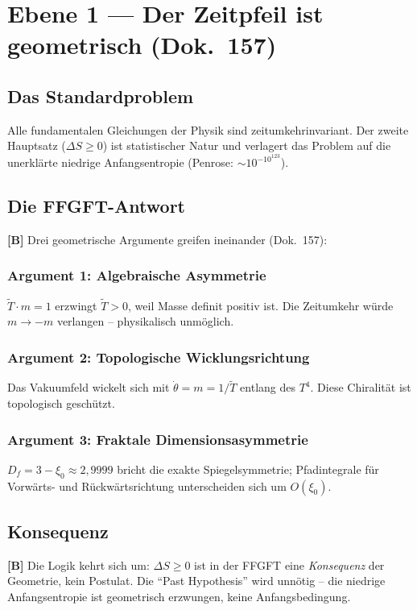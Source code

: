 \section{Ebene 1 --- Der Zeitpfeil ist geometrisch (Dok.~157)}

\subsection{Das Standardproblem}

Alle fundamentalen Gleichungen der Physik sind zeitumkehrinvariant.
Der zweite Hauptsatz ($\Delta S \ge 0$) ist statistischer Natur
und verlagert das Problem auf die unerklärte niedrige Anfangsentropie
(Penrose: $\sim 10^{-10^{123}}$).

\subsection{Die FFGFT-Antwort}

\textbf{[B]} Drei geometrische Argumente greifen ineinander (Dok.~157):

\subsubsection{Argument 1: Algebraische Asymmetrie}
$\tilde{T} \cdot m = 1$ erzwingt $\tilde{T} > 0$, weil Masse definit
positiv ist. Die Zeitumkehr würde $m \to -m$ verlangen –
physikalisch unmöglich.

\subsubsection{Argument 2: Topologische Wicklungsrichtung}
Das Vakuumfeld wickelt sich mit $\dot\theta = m = 1/\tilde{T}$
entlang des $T^4$. Diese Chiralität ist topologisch geschützt.

\subsubsection{Argument 3: Fraktale Dimensionsasymmetrie}
$D_f = 3 - \xi_0 \approx 2{,}9999$ bricht die exakte Spiegelsymmetrie;
Pfadintegrale für Vorwärts- und Rückwärtsrichtung unterscheiden sich um
$O(\xi_0)$.

\subsection{Konsequenz}

\textbf{[B]} Die Logik kehrt sich um: $\Delta S \ge 0$ ist in der FFGFT
eine \emph{Konsequenz} der Geometrie, kein Postulat. Die
\enquote{Past Hypothesis} wird unnötig – die niedrige Anfangsentropie
ist geometrisch erzwungen, keine Anfangsbedingung.

